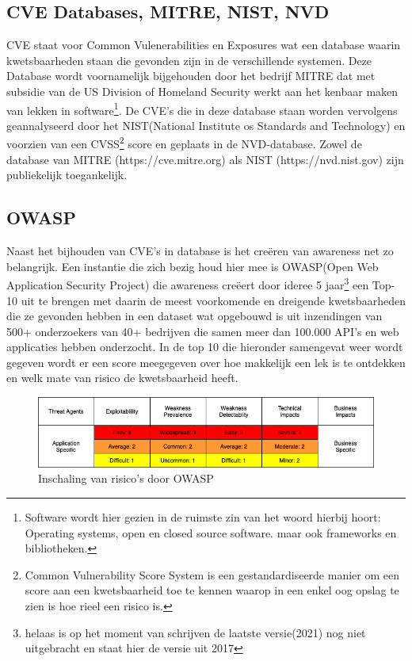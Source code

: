 \subsection{CVE Databases, MITRE, NIST, NVD}\label{subsec:mitre-nist-nvd}
CVE staat voor Common Vulenerabilities en Exposures wat een database waarin kwetsbaarheden staan die gevonden zijn in de verschillende systemen.
Deze Database wordt voornamelijk bijgehouden door het bedrijf MITRE dat met subsidie van de US Division of Homeland Security werkt aan het kenbaar maken van lekken in software\footnote{Software wordt hier gezien in de ruimste zin van het woord hierbij hoort: Operating systems, open en closed source software. maar ook frameworks en bibliotheken.}.
De CVE's die in deze database staan worden vervolgens geannalyseerd door het NIST(National Institute os Standards and Technology) en voorzien van een CVSS\footnote{Common Vulnerability Score System is een gestandardiseerde manier om een score aan een kwetsbaarheid toe te kennen waarop in een enkel oog opslag te zien is hoe rieel een risico is.} score en geplaats in de NVD-database.
Zowel de database van MITRE (https://cve.mitre.org) als NIST (https://nvd.nist.gov) zijn publiekelijk toegankelijk.

\subsection{OWASP}\label{subsec:owasp}
Naast het bijhouden van CVE's in database is het creëren van awareness net zo belangrijk.
Een instantie die zich bezig houd hier mee is OWASP(Open Web Application Security Project) die awareness creëert door ideree 5 jaar\footnote{helaas is op het moment van schrijven de laatste versie(2021) nog niet uitgebracht en staat hier de versie uit 2017} een Top-10 uit te brengen met daarin de meest voorkomende en dreigende kwetsbaarheden die ze gevonden hebben in een dataset wat opgebouwd is uit inzendingen van 500+ onderzoekers van 40+ bedrijven die samen meer dan 100.000 API's en web applicaties hebben onderzocht.
In de top 10 die hieronder samengevat weer wordt gegeven wordt er een score meegegeven over hoe makkelijk een lek is te ontdekken en welk mate van risico de kwetsbaarheid heeft.

\begin{figure}[H]
    \myfloatalign
    \includegraphics[width=12cm]{gfx/risk tabel}
    \caption{Inschaling van risico's door OWASP}
    \label{fig:risico inschaling}
\end{figure}

